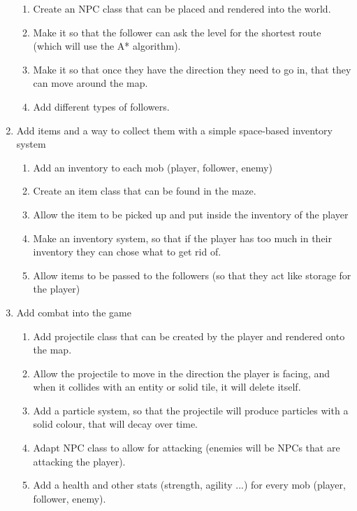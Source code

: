 \documentclass[../Main.tex]{subfiles}
\begin{document}
\begin{enumerate}
                \begin{enumerate}
                    \item Create an NPC class that can be placed and rendered into the world.
                    \item Make it so that the follower can ask the level for the shortest route (which will use the A* algorithm).
                    \item Make it so that once they have the direction they need to go in, that they can move around the map.
                    \item Add different types of followers.
                \end{enumerate}
            \item Add items and a way to collect them with a simple space-based inventory system
                \begin{enumerate}
                    \item Add an inventory to each mob (player, follower, enemy)
                    \item Create an item class that can be found in the maze.
                    \item Allow the item to be picked up and put inside the inventory of the player
                    \item Make an inventory system, so that if the player has too much in their inventory they can chose what to get rid of.
                    \item Allow items to be passed to the followers (so that they act like storage for the player)
                \end{enumerate}
            \item Add combat into the game
                \begin{enumerate}
                    \item Add projectile class that can be created by the player and rendered onto the map.
                    \item Allow the projectile to move in the direction the player is facing, and when it collides with an entity or solid tile, it will delete itself.
                    \item Add a particle system, so that the projectile will produce particles with a solid colour, that will decay over time.
                    \item Adapt NPC class to allow for attacking (enemies will be NPCs that are attacking the player).
                    \item Add a health and other stats (strength, agility ...) for every mob (player, follower, enemy).

\end{enumerate}
\end{enumerate}
\end{document}
